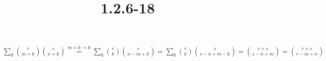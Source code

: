 \documentclass{article}
\title{1.2.6-18}
\begin{document}
\maketitle

\( \sum_k \binom{r}{m+k}\binom{s}{n+k} \overset{m + k \to k}{=} \sum_k \binom{r}{k}\binom{s}{n-m+k} = \sum_k \binom{r}{k}\binom{s}{s-n+m-k} = \binom{r+s}{s-n+m} = \binom{r+s}{r-m+n} \)
\end{document}
